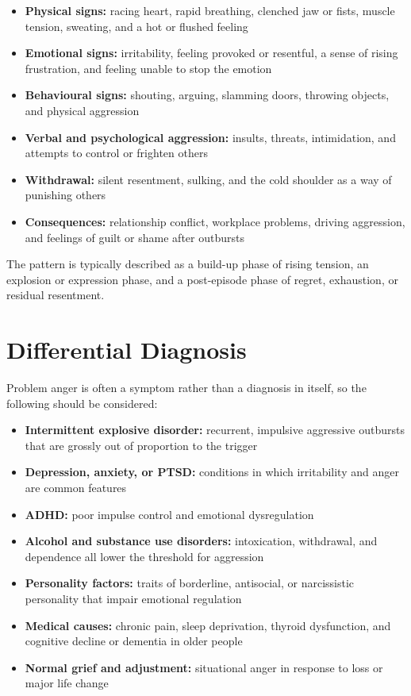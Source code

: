 \begin{itemize}
    \item \textbf{Physical signs:} racing heart, rapid breathing, clenched jaw or fists, muscle tension, sweating, and a hot or flushed feeling
    \item \textbf{Emotional signs:} irritability, feeling provoked or resentful, a sense of rising frustration, and feeling unable to stop the emotion
    \item \textbf{Behavioural signs:} shouting, arguing, slamming doors, throwing objects, and physical aggression
    \item \textbf{Verbal and psychological aggression:} insults, threats, intimidation, and attempts to control or frighten others
    \item \textbf{Withdrawal:} silent resentment, sulking, and the cold shoulder as a way of punishing others
    \item \textbf{Consequences:} relationship conflict, workplace problems, driving aggression, and feelings of guilt or shame after outbursts
\end{itemize}

The pattern is typically described as a build-up phase of rising tension, an explosion or expression phase, and a post-episode phase of regret, exhaustion, or residual resentment.

\section*{Differential Diagnosis}
Problem anger is often a symptom rather than a diagnosis in itself, so the following should be considered:

\begin{itemize}
    \item \textbf{Intermittent explosive disorder:} recurrent, impulsive aggressive outbursts that are grossly out of proportion to the trigger
    \item \textbf{Depression, anxiety, or PTSD:} conditions in which irritability and anger are common features
    \item \textbf{ADHD:} poor impulse control and emotional dysregulation
    \item \textbf{Alcohol and substance use disorders:} intoxication, withdrawal, and dependence all lower the threshold for aggression
    \item \textbf{Personality factors:} traits of borderline, antisocial, or narcissistic personality that impair emotional regulation
    \item \textbf{Medical causes:} chronic pain, sleep deprivation, thyroid dysfunction, and cognitive decline or dementia in older people
    \item \textbf{Normal grief and adjustment:} situational anger in response to loss or major life change
\end{itemize}

